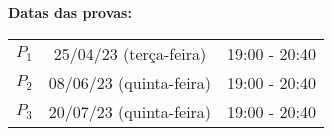 \documentclass{beamer}
\begin{document}
    \begin{frame}
        \bf{Datas das provas:}
        \begin{center}
            \begin{tabular}{c|c|c}
                \hline\hline
                \hspace{1cm}{\bf Prova}\hspace{1cm} & \hspace{3cm}{\bf Data}\hspace{3cm} & \hspace{1.7cm}{\bf Hor\'{a}rio}\hspace{1.7cm} \\
                \hline\hline
                $P_1$ & 25/04/23 (terça-feira) \phantom{x} & 19:00 - 20:40 \\
                \hline
                $P_2$ & 08/06/23 (quinta-feira) \phantom{x} & 19:00 - 20:40 \\
                \hline
                $P_3$ & 20/07/23 (quinta-feira) \phantom{x} & 19:00 - 20:40 \\
                \hline\hline
            \end{tabular}
        \end{center}
    \end{frame}
\end{document}
